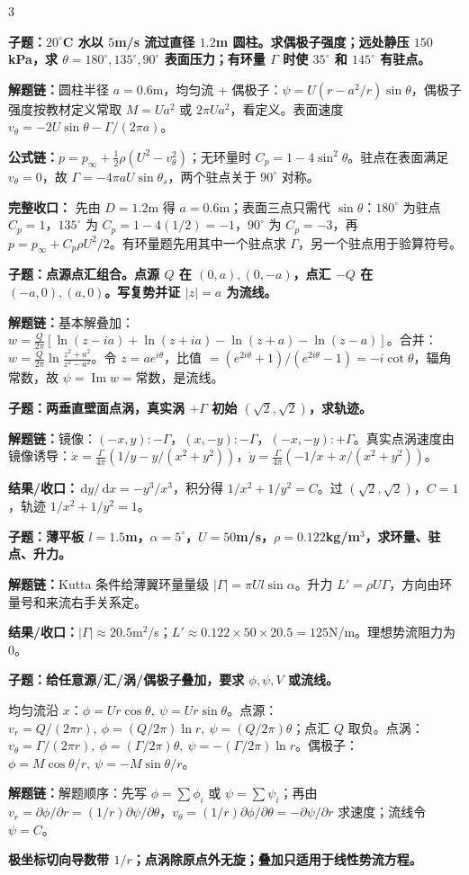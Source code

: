 \documentclass[a4paper]{article}
\newcommand{\qt}[1]{\vspace{0.04pt}\colorbox{Q}{\parbox{\dimexpr\linewidth-2\fboxsep}{\color{white}\bfseries #1}}\par}
\newcommand{\ans}[1]{\colorbox{G}{\parbox{\dimexpr\linewidth-2\fboxsep}{#1}}\par}
\newcommand{\warn}[1]{\colorbox{Y}{\parbox{\dimexpr\linewidth-2\fboxsep}{\color{E}\bfseries #1}}\par}
\newcommand{\chain}[1]{{\color{A}\bfseries 解题链：}#1\par}
\newcommand{\res}[1]{{\color{E}\bfseries 结果/收口：}#1\par}
\newcommand{\form}[1]{{\color{M}\bfseries 公式链：}#1\par}
\newcommand{\dd}{\,\mathrm d}
\begin{document}
\begin{multicols}{3}
\qt{子题：$20^\circ$C 水以 $5$m/s 流过直径 $1.2$m 圆柱。求偶极子强度；远处静压 $150$kPa，求 $\theta=180^\circ,135^\circ,90^\circ$ 表面压力；有环量 $\Gamma$ 时使 $35^\circ$ 和 $145^\circ$ 有驻点。}
\chain{圆柱半径 $a=0.6$m，均匀流 + 偶极子：$\psi=U(r-a^2/r)\sin\theta$，偶极子强度按教材定义常取 $M=Ua^2$ 或 $2\pi Ua^2$，看定义。表面速度 $v_\theta=-2U\sin\theta-\Gamma/(2\pi a)$。}
\form{$p=p_\infty+\frac12\rho(U^2-v_\theta^2)$；无环量时 $C_p=1-4\sin^2\theta$。驻点在表面满足 $v_\theta=0$，故 $\Gamma=-4\pi aU\sin\theta_s$，两个驻点关于 $90^\circ$ 对称。}
\ans{\textbf{完整收口：} 先由 $D=1.2$m 得 $a=0.6$m；表面三点只需代 $\sin\theta$：$180^\circ$ 为驻点 $C_p=1$，$135^\circ$ 为 $C_p=1-4(1/2)=-1$，$90^\circ$ 为 $C_p=-3$，再 $p=p_\infty+C_p\rho U^2/2$。有环量题先用其中一个驻点求 $\Gamma$，另一个驻点用于验算符号。}

\qt{子题：点源点汇组合。点源 $Q$ 在 $(0,a),(0,-a)$，点汇 $-Q$ 在 $(-a,0),(a,0)$。写复势并证 $|z|=a$ 为流线。}
\chain{基本解叠加：$w=\frac{Q}{2\pi}[\ln(z-ia)+\ln(z+ia)-\ln(z+a)-\ln(z-a)]$。合并：$w=\frac{Q}{2\pi}\ln\frac{z^2+a^2}{z^2-a^2}$。令 $z=ae^{i\theta}$，比值 $=(e^{2i\theta}+1)/(e^{2i\theta}-1)=-i\cot\theta$，辐角常数，故 $\psi=\operatorname{Im}w=$常数，是流线。}

\qt{子题：两垂直壁面点涡，真实涡 $+\Gamma$ 初始 $(\sqrt2,\sqrt2)$，求轨迹。}
\chain{镜像：$(-x,y):-\Gamma$，$(x,-y):-\Gamma$，$(-x,-y):+\Gamma$。真实点涡速度由镜像诱导：$\dot x=\frac{\Gamma}{4\pi}(1/y-y/(x^2+y^2))$，$\dot y=\frac{\Gamma}{4\pi}(-1/x+x/(x^2+y^2))$。}
\res{$\dd y/\dd x=-y^3/x^3$，积分得 $1/x^2+1/y^2=C$。过 $(\sqrt2,\sqrt2)$，$C=1$，轨迹 $1/x^2+1/y^2=1$。}

\qt{子题：薄平板 $l=1.5$m，$\alpha=5^\circ$，$U=50$m/s，$\rho=0.122$kg/m$^3$，求环量、驻点、升力。}
\chain{Kutta 条件给薄翼环量量级 $|\Gamma|=\pi Ul\sin\alpha$。升力 $L'=\rho U\Gamma$，方向由环量号和来流右手关系定。}
\res{$|\Gamma|\approx20.5$m$^2$/s；$L'\approx0.122\times50\times20.5=125$N/m。理想势流阻力为 0。}

\qt{子题：给任意源/汇/涡/偶极子叠加，要求 $\phi,\psi,V$ 或流线。}
\ans{均匀流沿 $x$：$\phi=Ur\cos\theta,\ \psi=Ur\sin\theta$。点源：$v_r=Q/(2\pi r),\ \phi=(Q/2\pi)\ln r,\ \psi=(Q/2\pi)\theta$；点汇 $Q$ 取负。点涡：$v_\theta=\Gamma/(2\pi r),\ \phi=(\Gamma/2\pi)\theta,\ \psi=-(\Gamma/2\pi)\ln r$。偶极子：$\phi=M\cos\theta/r,\ \psi=-M\sin\theta/r$。}
\chain{解题顺序：先写 $\phi=\sum\phi_i$ 或 $\psi=\sum\psi_i$；再由 $v_r=\partial\phi/\partial r=(1/r)\partial\psi/\partial\theta$，$v_\theta=(1/r)\partial\phi/\partial\theta=-\partial\psi/\partial r$ 求速度；流线令 $\psi=C$。}
\warn{极坐标切向导数带 $1/r$；点涡除原点外无旋；叠加只适用于线性势流方程。}


\end{multicols}
\end{document}
